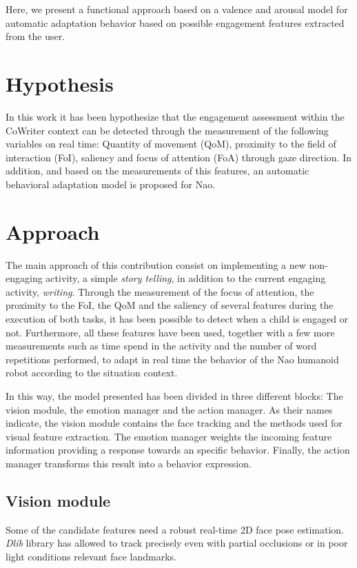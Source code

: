 \documentclass[a4paper, 10pt, conference]{ieeeconf}      %
\begin{document}
Here, we present a functional approach based on a valence and arousal model for automatic adaptation behavior based on possible engagement features extracted from the user. 
\section{Hypothesis}
In this work it has been hypothesize that the engagement assessment within the CoWriter context can be detected through the measurement of the following variables on real time: Quantity of movement (QoM), proximity to the field of interaction (FoI), saliency and focus of attention (FoA) through gaze direction. In addition, and based on the measurements of this features, an automatic behavioral adaptation model is proposed for Nao.

\section{Approach}
The main approach of this contribution consist on implementing a new non-engaging activity, a simple \textit{story telling}, in addition to the current engaging activity, \textit{writing}. Through the measurement of the focus of attention, the proximity to the FoI, the QoM and the saliency of several features during the execution of both tasks, it has been possible to detect when a child is engaged or not. Furthermore, all these features have been used, together with a few more measurements such as time spend in the activity and the number of word repetitions performed, to adapt in real time the behavior of the Nao humanoid robot according to the situation context.

In this way, the model presented has been divided in three different blocks: The vision module, the emotion manager and the action manager. As their names indicate, the vision module contains the face tracking and the methods used for visual feature extraction. The emotion manager weights the incoming feature information providing a response towards an specific behavior. Finally, the action manager transforms this result into a behavior expression.

\subsection{Vision module}
Some of the candidate features need a robust real-time 2D face pose estimation. \textit{Dlib} library has allowed to track precisely even with partial occlusions or in poor light conditions relevant face landmarks.
\end{document}
